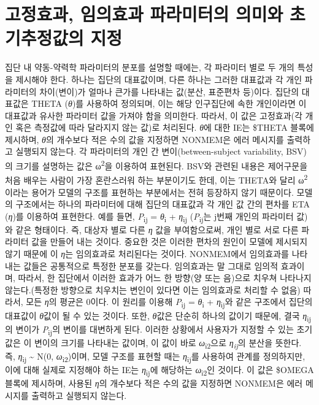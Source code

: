\documentclass[
  10pt,
  krantz2,
  a4paper]{krantz}
\theoremstyle{definition}
\theoremstyle{definition}
\theoremstyle{definition}
\theoremstyle{remark}
\begin{document}
\hypertarget{uxace0uxc815uxd6a8uxacfc-uxc784uxc758uxd6a8uxacfc-uxd30cuxb77cuxbbf8uxd130uxc758-uxc758uxbbf8uxc640-uxcd08uxae30uxcd94uxc815uxac12uxc758-uxc9c0uxc815}{%
\section{고정효과, 임의효과 파라미터의 의미와 초기추정값의 지정}\label{uxace0uxc815uxd6a8uxacfc-uxc784uxc758uxd6a8uxacfc-uxd30cuxb77cuxbbf8uxd130uxc758-uxc758uxbbf8uxc640-uxcd08uxae30uxcd94uxc815uxac12uxc758-uxc9c0uxc815}}

집단 내 약동-약력학 파라미터의 분포를 설명할 때에는, 각 파라미터 별로 두 개의 특성을 제시해야 한다. 하나는 집단의 대표값이며, 다른 하나는 그러한 대표값과 각 개인 파라미터의 차이(변이)가 얼마나 큰가를 나타내는 값(분산, 표준편차 등)이다. 집단의 대표값은 THETA (\emph{θ})를 사용하여 정의되며, 이는 해당 인구집단에 속한 개인이라면 이 대표값과 유사한 파라미터 값을 가져야 함을 의미한다. 따라서, 이 값은 고정효과(각 개인 혹은 측정값에 따라 달라지지 않는 값)로 처리된다. \emph{θ}에 대한 IE는 \$THETA 블록에 제시하며, \emph{θ}의 개수보다 적은 수의 값을 지정하면 NONMEM은 에러 메시지를 출력하고 실행되지 않는다. 각 파라미터의 개인 간 변이(between-subject variability, BSV)의 크기를 설명하는 값은 ω\textsuperscript{2}을 이용하여 표현된다. BSV와 관련된 내용은 제어구문을 처음 배우는 사람이 가장 혼란스러워 하는 부분이기도 한데, 이는 THETA와 달리 ω\textsuperscript{2}이라는 용어가 모델의 구조를 표현하는 부분에서는 전혀 등장하지 않기 때문이다. 모델의 구조에서는 하나의 파라미터에 대해 집단의 대표값과 각 개인 값 간의 편차를 ETA (\emph{η})를 이용하여 표현한다. 예를 들면, \emph{P}\textsubscript{ij} = \emph{θ}\textsubscript{i} + \emph{η}\textsubscript{ij} (\emph{P}\textsubscript{ij}는 j번째 개인의 파라미터 값)와 같은 형태이다. 즉, 대상자 별로 다른 \emph{η} 값을 부여함으로써, 개인 별로 서로 다른 파라미터 값을 만들어 내는 것이다. 중요한 것은 이러한 편차의 원인이 모델에 제시되지 않기 때문에 이 \emph{η}는 임의효과로 처리된다는 것이다. NONMEM에서 임의효과를 나타내는 값들은 공통적으로 특정한 분포를 갖는다. 임의효과는 말 그대로 임의적 효과이며, 따라서, 한 집단에서 이러한 효과가 어느 한 방향(양 또는 음)으로 치우쳐 나타나지 않는다.(특정한 방향으로 치우치는 변인이 있다면 이는 임의효과로 처리할 수 없음) 따라서, 모든 \emph{η}의 평균은 0이다. 이 원리를 이용해 \emph{P}\textsubscript{ij} = \emph{θ}\textsubscript{i} + \emph{η}\textsubscript{ij}와 같은 구조에서 집단의 대표값이 \emph{θ}값이 될 수 있는 것이다. 또한, \emph{θ}값은 단순히 하나의 값이기 때문에, 결국 \emph{η}\textsubscript{ij}의 변이가 \emph{P}\textsubscript{ij}의 변이를 대변하게 된다. 이러한 상황에서 사용자가 지정할 수 있는 초기값은 이 변이의 크기를 나타내는 값이며, 이 값이 바로 \emph{ω}\textsubscript{i2}으로 \emph{η\textsubscript{ij}}의 분산을 뜻한다. 즉, \emph{η}\textsubscript{ij} \textasciitilde{} N(0, \emph{ω}\textsubscript{i2})이며, 모델 구조를 표현할 때는 \emph{η}\textsubscript{ij}를 사용하여 관계를 정의하지만, 이에 대해 실제로 지정해야 하는 IE는 \emph{η}\textsubscript{ij}에 해당하는 \emph{ω}\textsubscript{i2}인 것이다. 이 값은 \$OMEGA 블록에 제시하며, 사용된 \emph{η}의 개수보다 적은 수의 값을 지정하면 NONMEM은 에러 메시지를 출력하고 실행되지 않는다.
\end{document}
